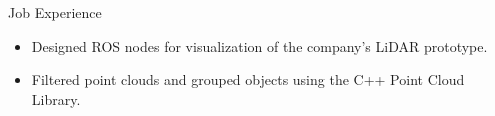 \begin{rubric}{Job Experience}
\begin{itemize}[leftmargin=*, rightmargin=1cm]
	\item Designed ROS nodes for visualization of the company's LiDAR prototype.  
	\item Filtered point clouds and grouped objects using the C++ Point Cloud Library.  
\end{itemize}
\begin{comment}
%
%
\entry*[] \textbf{Creative Edge LLC} \hfill 08.2017 -- 09.2018 \newline
\textit{Software Engineer} \hfill Denver, USA \newline
\vspace{\CVItemizeHeaderSpacing} \begin{itemize}[leftmargin=*, rightmargin=1cm]
	\setlength{\itemsep}{\CVItemizeSpacing}
	\item Developed applications for cryptocurrency mining in both Windows and Linux.  
	\item Wrote software managing OS drivers, system configurations, and 3rd party tools.
\end{itemize}
\end{comment}
\end{rubric}
